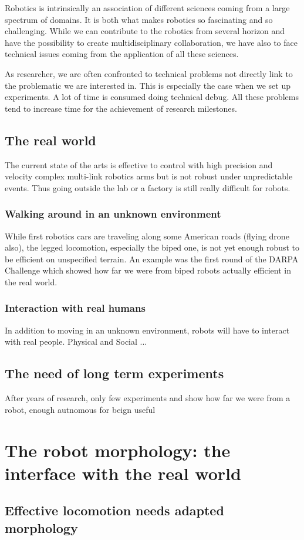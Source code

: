 Robotics is intrinsically an association of different sciences coming from a large spectrum of domains. It is both what makes robotics so fascinating and so challenging. While we can contribute to the robotics from several horizon and have the possibility to create multidisciplinary collaboration, we have also to face technical issues coming from the application of all these sciences.

As researcher, we  are often confronted to technical problems not directly link to the problematic we are interested in. This is especially the case when we set up experiments. A lot of time is consumed doing technical debug. All these problems tend to increase time for the achievement of research milestones.


\subsection{The real world} %

The current state of the arts is effective to control with high precision and velocity complex multi-link robotics arms but is not robust under unpredictable events. Thus going outside the lab or a factory is still really difficult for robots. 

\subsubsection{Walking around in an unknown environment} %
While first robotics cars are traveling along some American roads (flying drone also), the legged locomotion, especially the biped one, is not yet enough robust to be efficient on unspecified terrain. An example was the first round of the DARPA Challenge which showed how far we were from biped robots actually efficient in the real world.


\subsubsection{Interaction with real humans} %
In addition to moving in an unknown environment, robots will have to interact with real people. 
Physical and Social ... 


\subsection{The need of long term experiments} %
After years of research, only few experiments and show how far we were from a robot, enough autnomous for beign useful



\section{The robot morphology: the interface with the real world} %

\subsection{Effective locomotion needs adapted morphology} %



